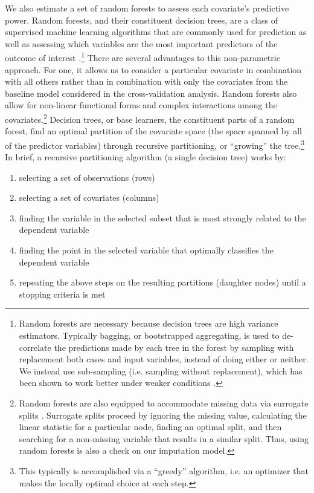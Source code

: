 \documentclass[12pt]{article}
\begin{document}
We also estimate a set of random forests to assess each covariate's predictive power. Random forests, and their constituent decision trees, are a class of supervised machine learning algorithms that are commonly used for prediction as well as assessing which variables are the most important predictors of the outcome of interest  \citep[pp. 543-551]{murphy2012machine}.\footnote{Random forests are necessary because decision trees are high variance estimators. Typically bagging, or bootstrapped aggregating, is used to de-correlate the predictions made by each tree in the forest by sampling with replacement both cases and input variables, instead of doing either or neither. We instead use sub-sampling (i.e. sampling without replacement), which has been shown to work better under weaker conditions \citep{politis-sub}.} There are several advantages to this non-parametric approach. For one, it allows us to consider a particular covariate in combination with all others rather than in combination with only the covariates from the baseline model considered in the cross-validation analysis. Random forests also allow for non-linear functional forms and complex interactions among the covariates.\footnote{Random forests are also equipped to accommodate missing data via surrogate splits \citep{hothorn2006unbiased}. Surrogate splits proceed by ignoring the missing value, calculating the linear statistic for a particular node, finding an optimal split, and then searching for a non-missing variable that results in a similar split. Thus, using random forests is also a check on our imputation model.} Decision trees, or base learners, the constituent parts of a random forest, find an optimal partition of the covariate space (the space spanned by all of the predictor variables) through recursive partitioning, or ``growing'' the tree.\footnote{This typically is accomplished via a ``greedy'' algorithm, i.e. an optimizer that makes the locally optimal choice at each step.} In brief, a recursive partitioning algorithm (a single decision tree) works by:
\begin{enumerate}
\item selecting a set of observations (rows)
\item selecting a set of covariates (columns)
\item finding the variable in the selected subset that is most strongly related to the dependent variable
\item finding the point in the selected variable that optimally classifies the dependent variable
\item repeating the above steps on the resulting partitions (daughter nodes) until a stopping criteria is met
\end{enumerate}
\end{document}
